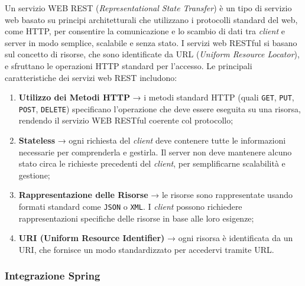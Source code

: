 Un servizio WEB REST (\textit{Representational State Transfer}) è un tipo di servizio web basato su principi architetturali che utilizzano i protocolli standard del web, come HTTP, per consentire la comunicazione e lo scambio di dati tra \textit{client} e server in modo semplice, scalabile e senza stato\cite{SPRING_html}. I servizi web RESTful si basano sul concetto di risorse, che sono identificate da URL (\textit{Uniform Resource Locator}), e sfruttano le operazioni HTTP standard per l’accesso.\cite{SPRING_html2}
Le principali caratteristiche dei servizi web REST includono:
\begin{enumerate}
    \item \textbf{Utilizzo dei Metodi HTTP} → i metodi standard HTTP (quali \texttt{GET}, \texttt{PUT}, \texttt{POST}, \texttt{DELETE}) specificano l’operazione che deve essere eseguita su una risorsa, rendendo il servizio WEB RESTful coerente col protocollo;
    \item \textbf{Stateless} → ogni richiesta del \textit{client} deve contenere tutte le informazioni necessarie per comprenderla e gestirla. Il server non deve mantenere alcuno stato circa le richieste precedenti del \textit{client}, per semplificarne scalabilità e gestione;
    \item \textbf{Rappresentazione delle Risorse} → le risorse sono rappresentate usando formati standard come \texttt{JSON} o \texttt{XML}. I \textit{client} possono richiedere rappresentazioni specifiche delle risorse in base alle loro esigenze;
    \item \textbf{URI (Uniform Resource Identifier)} → ogni risorsa è identificata da un URI, che fornisce un modo standardizzato per accedervi tramite URL.
\end{enumerate}

\subsubsection{Integrazione Spring}

